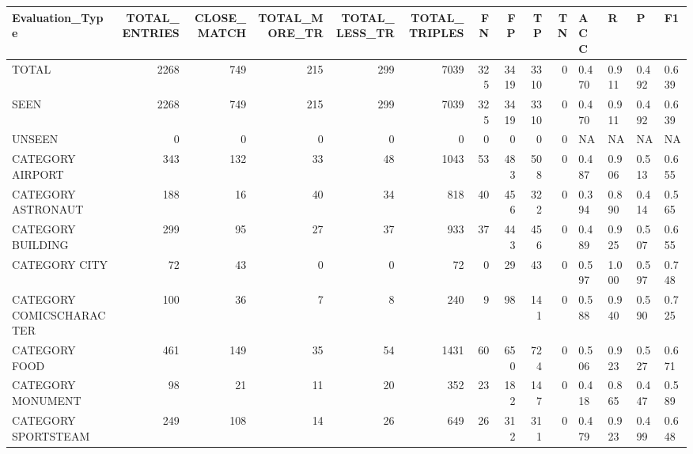 \begin{tabular}{lrrrrrrrrrllll}
\hline
 Evaluation\_Type          &   TOTAL\_ENTRIES &   CLOSE\_MATCH &   TOTAL\_MORE\_TR &   TOTAL\_LESS\_TR &   TOTAL\_TRIPLES &   FN &   FP &   TP &   TN & ACC   & R     & P     & F1    \\
\hline
 TOTAL                    &            2268 &           749 &             215 &             299 &            7039 &  325 & 3419 & 3310 &    0 & 0.470 & 0.911 & 0.492 & 0.639 \\
 SEEN                     &            2268 &           749 &             215 &             299 &            7039 &  325 & 3419 & 3310 &    0 & 0.470 & 0.911 & 0.492 & 0.639 \\
 UNSEEN                   &               0 &             0 &               0 &               0 &               0 &    0 &    0 &    0 &    0 & NA    & NA    & NA    & NA    \\
 CATEGORY AIRPORT         &             343 &           132 &              33 &              48 &            1043 &   53 &  483 &  508 &    0 & 0.487 & 0.906 & 0.513 & 0.655 \\
 CATEGORY ASTRONAUT       &             188 &            16 &              40 &              34 &             818 &   40 &  456 &  322 &    0 & 0.394 & 0.890 & 0.414 & 0.565 \\
 CATEGORY BUILDING        &             299 &            95 &              27 &              37 &             933 &   37 &  443 &  456 &    0 & 0.489 & 0.925 & 0.507 & 0.655 \\
 CATEGORY CITY            &              72 &            43 &               0 &               0 &              72 &    0 &   29 &   43 &    0 & 0.597 & 1.000 & 0.597 & 0.748 \\
 CATEGORY COMICSCHARACTER &             100 &            36 &               7 &               8 &             240 &    9 &   98 &  141 &    0 & 0.588 & 0.940 & 0.590 & 0.725 \\
 CATEGORY FOOD            &             461 &           149 &              35 &              54 &            1431 &   60 &  650 &  724 &    0 & 0.506 & 0.923 & 0.527 & 0.671 \\
 CATEGORY MONUMENT        &              98 &            21 &              11 &              20 &             352 &   23 &  182 &  147 &    0 & 0.418 & 0.865 & 0.447 & 0.589 \\
 CATEGORY SPORTSTEAM      &             249 &           108 &              14 &              26 &             649 &   26 &  312 &  311 &    0 & 0.479 & 0.923 & 0.499 & 0.648 \\

\end{tabular}
